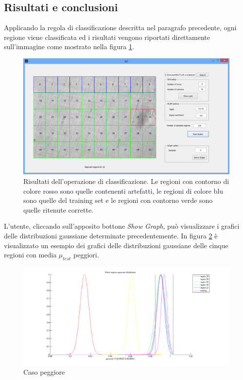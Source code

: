 \subsection{Risultati e conclusioni}
Applicando la regola di classificazione descritta nel paragrafo precedente, ogni regione viene classificata ed i risultati vengono riportati direttamente sull'immagine come mostrato nella figura \ref{fig:GUIpostLBP}.

\begin{figure}[ht]
\begin{center}
\includegraphics[width=.95\textwidth]{img/gui_post_lbp}
\caption{Risultati dell'operazione di classificazione. Le regioni con contorno di colore rosso sono quelle contenenti artefatti, le regioni di colore blu sono quelle del training set e le regioni con contorno verde sono quelle ritenute corrette. }
\label{fig:GUIpostLBP}
\end{center}
\end{figure}

L'utente, cliccando sull'apposito bottone \textit{Show Graph}, può visualizzare i grafici delle distribuzioni gaussiane determinate precedentemente. In figura \ref{fig:worstGraph} è visualizzato un esempio dei grafici delle distribuzioni gaussiane delle cinque regioni con media $\mu_{test}$ peggiori.


\begin{figure}[ht]
\begin{center}
\includegraphics[width=.95\textwidth]{img/worst_graph}
\caption{ Caso peggiore }
\label{fig:worstGraph}
\end{center}
\end{figure}


